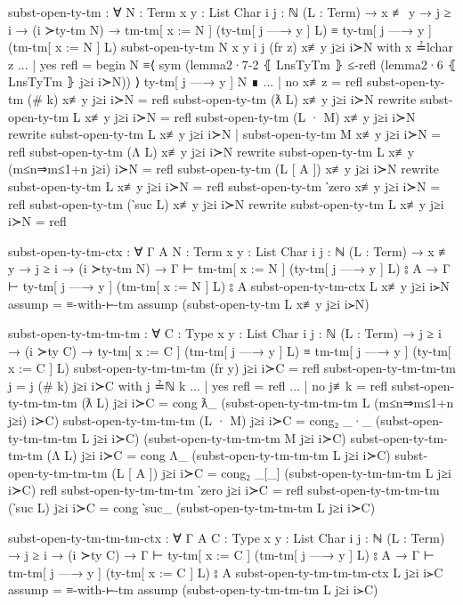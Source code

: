 \documentclass[logo,bsc,singlespacing,parskip,online]{infthesis}
\renewenvironment{code}{\mintedcopy[breaklines,breaksymbolleft=\;]{agda}}{\endmintedcopy}
\begin{document}
\begin{code}
  subst-open-ty-tm : ∀ {N : Term} {x y : List Char} {i j : ℕ}
    (L : Term)
    → x ≢ y
    → j ≥ i
    → (i ≻ty-tm N)
    → tm-tm[ x := N ] (ty-tm[ j —→ y ] L)
      ≡ ty-tm[ j —→ y ] (tm-tm[ x := N ] L)
  subst-open-ty-tm {N} {x} {y} {i} {j} (fr z) x≢y j≥i i≻N with x ≟lchar z
  ... | yes refl =
    begin
      N
    ≡⟨ sym (lemma2·7-2 ⦃ LnsTyTm ⦄ ≤-refl (lemma2·6 ⦃ LnsTyTm ⦄ j≥i i≻N)) ⟩
      ty-tm[ j —→ y ] N
    ∎
  ... | no  x≢z  = refl
  subst-open-ty-tm (# k) x≢y j≥i i≻N = refl
  subst-open-ty-tm (ƛ L) x≢y j≥i i≻N
    rewrite subst-open-ty-tm L x≢y j≥i i≻N = refl
  subst-open-ty-tm (L · M) x≢y j≥i i≻N
    rewrite subst-open-ty-tm L x≢y j≥i i≻N
    | subst-open-ty-tm M x≢y j≥i i≻N
    = refl
  subst-open-ty-tm (Λ L) x≢y j≥i i≻N
    rewrite subst-open-ty-tm L x≢y (m≤n⇒m≤1+n j≥i) i≻N = refl
  subst-open-ty-tm (L [ A ]) x≢y j≥i i≻N
    rewrite subst-open-ty-tm L x≢y j≥i i≻N = refl
  subst-open-ty-tm ‵zero x≢y j≥i i≻N = refl
  subst-open-ty-tm (‵suc L) x≢y j≥i i≻N rewrite
    subst-open-ty-tm L x≢y j≥i i≻N = refl

  subst-open-ty-tm-ctx : ∀ {Γ A} {N : Term} {x y : List Char} {i j : ℕ}
    (L : Term)
    → x ≢ y
    → j ≥ i
    → (i ≻ty-tm N)
    → Γ ⊢ tm-tm[ x := N ] (ty-tm[ j —→ y ] L) ⦂ A
    → Γ ⊢ ty-tm[ j —→ y ] (tm-tm[ x := N ] L) ⦂ A
  subst-open-ty-tm-ctx L x≢y j≥i i≻N assump = ≡-with-⊢-tm assump (subst-open-ty-tm L x≢y j≥i i≻N)

  subst-open-ty-tm-tm-tm : ∀ {C : Type} {x y : List Char} {i j : ℕ}
    (L : Term)
    → j ≥ i
    → (i ≻ty C)
    → ty-tm[ x := C ] (tm-tm[ j —→ y ] L)
      ≡ tm-tm[ j —→ y ] (ty-tm[ x := C ] L)
  subst-open-ty-tm-tm-tm (fr y) j≥i i≻C = refl
  subst-open-ty-tm-tm-tm {j = j} (# k) j≥i i≻C with j ≟ℕ k
  ... | yes refl = refl
  ... | no  j≢k  = refl
  subst-open-ty-tm-tm-tm (ƛ L) j≥i i≻C = cong ƛ_
    (subst-open-ty-tm-tm-tm L (m≤n⇒m≤1+n j≥i) i≻C)
  subst-open-ty-tm-tm-tm (L · M) j≥i i≻C = cong₂ _·_
    (subst-open-ty-tm-tm-tm L j≥i i≻C)
    (subst-open-ty-tm-tm-tm M j≥i i≻C)
  subst-open-ty-tm-tm-tm (Λ L) j≥i i≻C = cong Λ_
    (subst-open-ty-tm-tm-tm L j≥i i≻C)
  subst-open-ty-tm-tm-tm (L [ A ]) j≥i i≻C = cong₂ _[_]
    (subst-open-ty-tm-tm-tm L j≥i i≻C)
    refl
  subst-open-ty-tm-tm-tm ‵zero j≥i i≻C = refl
  subst-open-ty-tm-tm-tm (‵suc L) j≥i i≻C = cong ‵suc_
    (subst-open-ty-tm-tm-tm L j≥i i≻C)

  subst-open-ty-tm-tm-tm-ctx : ∀ {Γ A} {C : Type} {x y : List Char} {i j : ℕ}
    (L : Term)
    → j ≥ i
    → (i ≻ty C)
    → Γ ⊢ ty-tm[ x := C ] (tm-tm[ j —→ y ] L) ⦂ A
    → Γ ⊢ tm-tm[ j —→ y ] (ty-tm[ x := C ] L) ⦂ A
  subst-open-ty-tm-tm-tm-ctx L j≥i i≻C assump = ≡-with-⊢-tm assump (subst-open-ty-tm-tm-tm L j≥i i≻C)


\end{code}
\end{document}
